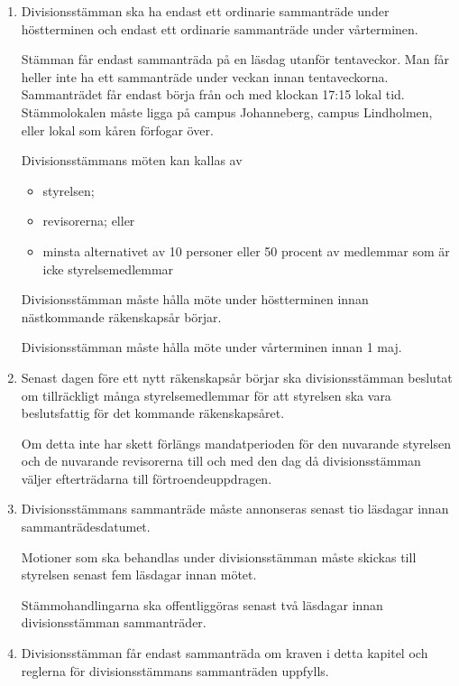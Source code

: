 \documentclass{dvd}
\begin{document}
	\begin{enumerate}[label=\arabic* §, ref=\arabic*]
		\item Divisionsstämman ska ha endast ett ordinarie sammanträde under höstterminen och endast ett ordinarie sammanträde under vårterminen.

		Stämman får endast sammanträda på en läsdag utanför tentaveckor.
		Man får heller inte ha ett sammanträde under veckan innan tentaveckorna.
		Sammanträdet får endast börja från och med klockan 17:15 lokal tid.
		Stämmolokalen måste ligga på campus Johanneberg, campus Lindholmen, eller lokal som kåren förfogar över.

                Divisionsstämmans möten kan kallas av
                \begin{itemize}
                    \item styrelsen;
                    \item revisorerna; eller
                    \item minsta alternativet av 10 personer eller 50 procent av medlemmar som är icke styrelsemedlemmar
                \end{itemize}

                Divisionsstämman måste hålla möte under höstterminen innan nästkommande räkenskapsår börjar.

                Divisionsstämman måste hålla möte under vårterminen innan 1 maj.


		\item Senast dagen före ett nytt räkenskapsår börjar ska divisionsstämman beslutat om tillräckligt många styrelsemedlemmar för att styrelsen ska vara beslutsfattig för det kommande räkenskapsåret.

		Om detta inte har skett förlängs mandatperioden för den nuvarande styrelsen och de nuvarande revisorerna till och med den dag då divisionsstämman väljer efterträdarna till förtroendeuppdragen.

		\item Divisionsstämmans sammanträde måste annonseras senast tio läsdagar innan sammanträdesdatumet.

		Motioner som ska behandlas under divisionsstämman måste skickas till styrelsen senast fem läsdagar innan mötet.

		Stämmohandlingarna ska offentliggöras senast två läsdagar innan divisionsstämman sammanträder.

		\item Divisionsstämman får endast sammanträda om kraven i detta kapitel och reglerna för divisionsstämmans sammanträden uppfylls.


\end{enumerate}
\end{document}
